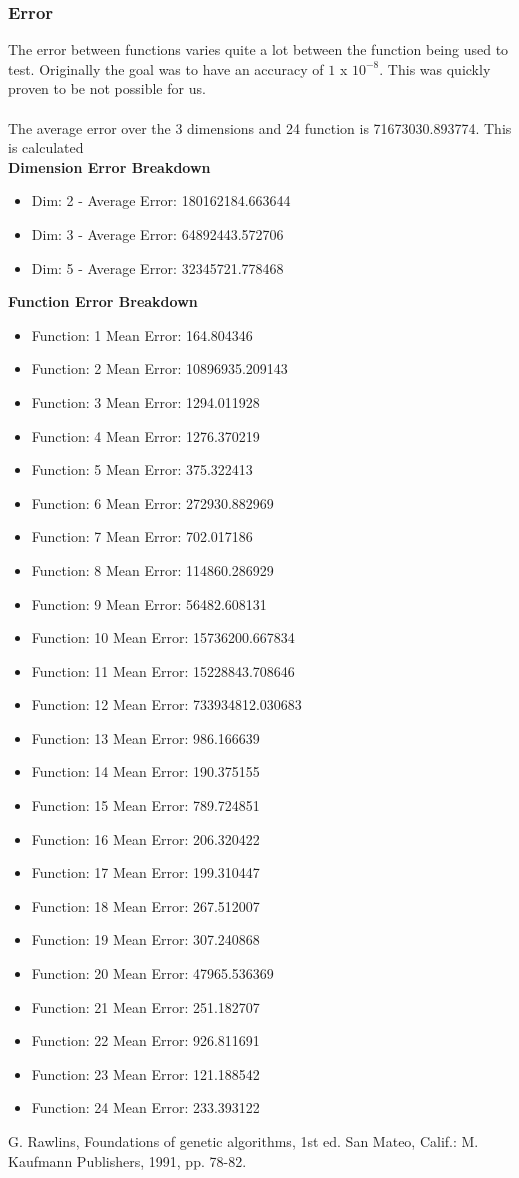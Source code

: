 \documentclass[12pt]{article}
\begin{document}
\subsubsection{Error}
The error between functions varies quite a lot between the function being used to test. Originally the goal was to have an accuracy of $1$ x $10^{-8}$. This was quickly proven to be not possible for us. \\\\
The average error over the 3 dimensions and 24 function is 71673030.893774. This is calculated\\

\textbf{Dimension Error Breakdown}
\begin{itemize}
	\item Dim: 2 - Average Error: 180162184.663644
	\item Dim: 3 - Average Error: 64892443.572706
	\item Dim: 5 - Average Error: 32345721.778468
\end{itemize}

\textbf{Function Error Breakdown}
\begin{itemize}
	\item Function: 1  Mean Error: 164.804346
	\item Function: 2  Mean Error: 10896935.209143
	\item Function: 3  Mean Error: 1294.011928
	\item Function: 4  Mean Error: 1276.370219
	\item Function: 5  Mean Error: 375.322413
	\item Function: 6  Mean Error: 272930.882969
	\item Function: 7  Mean Error: 702.017186
	\item Function: 8  Mean Error: 114860.286929
	\item Function: 9  Mean Error: 56482.608131
	\item Function: 10  Mean Error: 15736200.667834
	\item Function: 11  Mean Error: 15228843.708646
	\item Function: 12  Mean Error: 733934812.030683
	\item Function: 13  Mean Error: 986.166639
	\item Function: 14  Mean Error: 190.375155
	\item Function: 15  Mean Error: 789.724851
	\item Function: 16  Mean Error: 206.320422
	\item Function: 17  Mean Error: 199.310447
	\item Function: 18  Mean Error: 267.512007
	\item Function: 19  Mean Error: 307.240868
	\item Function: 20  Mean Error: 47965.536369
	\item Function: 21  Mean Error: 251.182707
	\item Function: 22  Mean Error: 926.811691
	\item Function: 23  Mean Error: 121.188542
	\item Function: 24  Mean Error: 233.393122
\end{itemize}


\newpage
\begin{thebibliography}{9}
G. Rawlins, Foundations of genetic algorithms, 1st ed. San Mateo, Calif.: M. Kaufmann Publishers, 1991, pp. 78-82.
\end{thebibliography}
\end{document}
